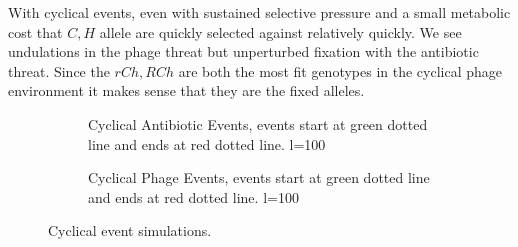 \FloatBarrier
With cyclical events, even with sustained selective pressure and a small metabolic cost that $C,H$ allele are quickly selected against relatively quickly.
We see undulations in the phage threat but unperturbed fixation with the antibiotic threat.
Since the $rCh,RCh$ are both the most fit genotypes in the cyclical phage environment it makes sense that they are the fixed alleles.
\FloatBarrier
\begin{figure}[htb!]
    \centering
    \begin{subfigure}[t]{0.45\textwidth}
        \centering
        \caption{Cyclical Antibiotic Events, events start at green dotted line and ends at red dotted line. l=100}
    \end{subfigure}
    \begin{subfigure}[t]{0.45\textwidth}
        \centering
        \caption{Cyclical Phage Events, events start at green dotted line and ends at red dotted line. l=100}
    \end{subfigure}
    \caption{Cyclical event simulations.}
\end{figure}
